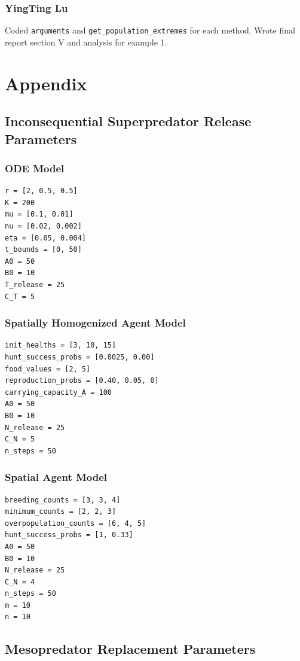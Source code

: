 \documentclass[journal]{IEEEtran}
\begin{document}
\subsubsection*{YingTing Lu} Coded \verb|arguments| and \verb |get_population_extremes| for each method. Wrote final report section V and analysis for example 1.




\newpage

\section{Appendix}
\subsection{Inconsequential Superpredator Release Parameters}
\subsubsection{ODE Model}
\begin{verbatim}
r = [2, 0.5, 0.5]
K = 200
mu = [0.1, 0.01]
nu = [0.02, 0.002]
eta = [0.05, 0.004]
t_bounds = [0, 50]
A0 = 50
B0 = 10
T_release = 25
C_T = 5
\end{verbatim}
\subsubsection{Spatially Homogenized Agent Model}
\begin{verbatim}
init_healths = [3, 10, 15]
hunt_success_probs = [0.0025, 0.00]
food_values = [2, 5]
reproduction_probs = [0.40, 0.05, 0]
carrying_capacity_A = 100
A0 = 50
B0 = 10
N_release = 25
C_N = 5
n_steps = 50
\end{verbatim}
\subsubsection{Spatial Agent Model}
\begin{verbatim}
breeding_counts = [3, 3, 4]
minimum_counts = [2, 2, 3]
overpopulation_counts = [6, 4, 5]
hunt_success_probs = [1, 0.33]
A0 = 50
B0 = 10
N_release = 25
C_N = 4
n_steps = 50
m = 10
n = 10
\end{verbatim}

\subsection{Mesopredator Replacement Parameters}
\end{document}

